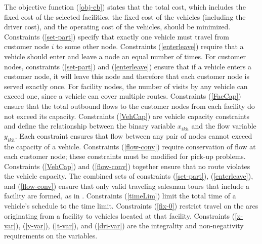 \documentclass[11pt]{article}
\newcommand{\zelihaupdate}[1]{\noindent \textcolor{blue}{\bf ZE -- UPDATE: #1 } }
\begin{document}
The objective function (\ref{obj-eb}) states that the total cost, which  
includes the fixed cost of the selected facilities, the fixed cost of the vehicles
(including the driver cost), and the operating cost of the vehicles,
should be minimized. 
Constraints 
(\ref{set-part}) specify that exactly one vehicle must travel from customer node $i$
to some other node. Constraints (\ref{enterleave}) require that a vehicle should enter 
and leave a node an equal number of times. For customer nodes, constraints 
(\ref{set-part}) and (\ref{enterleave}) ensure that if a vehicle enters a 
customer node, it will leave this node and therefore that each customer 
node is served exactly once. For facility nodes, the number of visits by any 
vehicle can exceed one, since a vehicle can cover multiple routes. 
Constraints (\ref{FacCap}) ensure that the total outbound flows to the customer nodes 
from each facility do not exceed its capacity. 
Constraints (\ref{VehCap}) are vehicle capacity constraints and define the 
relationship between the binary variable $x_{ikh}$ and the flow variable 
$y_{ikh}$. Each constraint ensures that flow between any pair of nodes
cannot exceed the capacity of a vehicle. Constraints (\ref{flow-conv})
require conservation of flow at each customer node; these constraints
must be modified for pick-up problems.
Constraints (\ref{VehCap}) and (\ref{flow-conv}) 
together ensure that no route violates the vehicle capacity.
The combined sets of constraints (\ref{set-part}), (\ref{enterleave}),
and (\ref{flow-conv}) ensure that only valid traveling salesman
tours that include a  facility are formed, as in 
\citet {Nambiar}.  Constraints (\ref{timeLim}) limit the 
total time of a vehicle's schedule to the time limit. 
Constraints (\ref{fix-0}) restrict travel on the arcs originating from 
a facility to vehicles located at that facility.
Constraints (\ref{x-var}), (\ref{y-var}), (\ref{t-var}), and (\ref{dri-var}) 
are the integrality and non-negativity requirements on the variables.    

\end{document}
